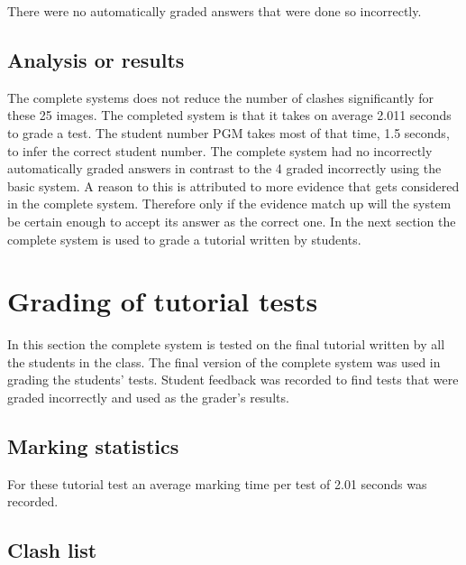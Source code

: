 There were no automatically graded answers that were done so incorrectly.

\subsection{Analysis or results}

The complete systems does not reduce the number of clashes significantly for these 25 images. The completed system is that it takes on average 2.011 seconds to grade a test. The student number PGM takes most of that time, 1.5 seconds, to infer the correct student number. The complete system had no incorrectly automatically graded answers in contrast to the 4 graded incorrectly using the basic system. A reason to this is attributed to more evidence that gets considered in the complete system. Therefore only if the evidence match up will the system be certain enough to accept its answer as the correct one. In the next section the complete system is used to grade a tutorial written by students. 

\section{Grading of tutorial tests}
In this section the complete system is tested on the final tutorial written by all the students in the class. The final version of the complete system was used in grading the students' tests. Student feedback was recorded to find tests that were graded incorrectly and used as the grader's results. 

\subsection{Marking statistics}

For these tutorial test  an average marking time per test of 2.01 seconds was recorded.

\subsection{Clash list}

